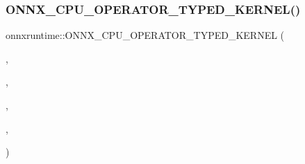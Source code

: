 \subsubsection{\texorpdfstring{O\+N\+N\+X\+\_\+\+C\+P\+U\+\_\+\+O\+P\+E\+R\+A\+T\+O\+R\+\_\+\+T\+Y\+P\+E\+D\+\_\+\+K\+E\+R\+N\+E\+L()}{ONNX\_CPU\_OPERATOR\_TYPED\_KERNEL()}\hspace{0.1cm}{\footnotesize\ttfamily [16/25]}}
{\footnotesize\ttfamily onnxruntime\+::\+O\+N\+N\+X\+\_\+\+C\+P\+U\+\_\+\+O\+P\+E\+R\+A\+T\+O\+R\+\_\+\+T\+Y\+P\+E\+D\+\_\+\+K\+E\+R\+N\+EL (\begin{DoxyParamCaption}\item[{\mbox{\hyperlink{classonnxruntime_1_1Cast}{Cast}}}]{,  }\item[{6}]{,  }\item[{\mbox{\hyperlink{uniononnxruntime_1_1MLFloat16}{M\+L\+Float16}}}]{,  }\item[{\mbox{\hyperlink{classonnxruntime_1_1KernelDefBuilder}{Kernel\+Def\+Builder}}().Type\+Constraint(\char`\"{}T1\char`\"{}, Data\+Type\+Impl\+::\+Get\+Tensor\+Type$<$ \mbox{\hyperlink{uniononnxruntime_1_1MLFloat16}{M\+L\+Float16}} $>$()).Type\+Constraint(\char`\"{}T2\char`\"{}, cast\+Op\+Type\+Constraints)}]{,  }\item[{\mbox{\hyperlink{classonnxruntime_1_1Cast}{Cast}}$<$ \mbox{\hyperlink{uniononnxruntime_1_1MLFloat16}{M\+L\+Float16}} $>$}]{ }\end{DoxyParamCaption})}

\mbox{\label{namespaceonnxruntime_a46dc6618b921c9c8f00289cab5f7d07e}} 
